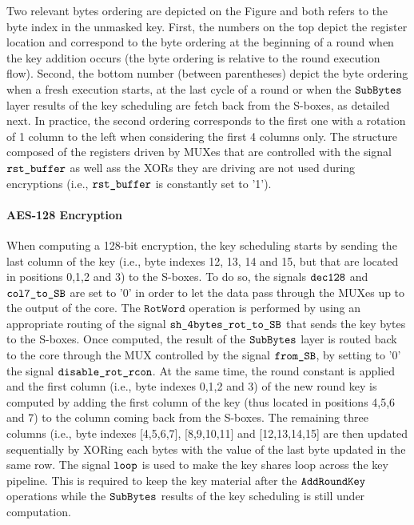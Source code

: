 \documentclass{scrartcl}
\begin{document}
Two relevant bytes ordering are depicted on the Figure and both refers to the
byte index in the unmasked key. First, the numbers on the top depict the
register location and correspond to the byte ordering at the beginning of a
round when the key addition occurs (the byte ordering is relative to the round
execution flow). Second, the bottom number (between parentheses) depict the
byte ordering when a fresh execution starts, at the last cycle of a round or
when the $\texttt{SubBytes}$ layer results of the key scheduling are fetch back from the
S-boxes, as detailed next. In practice, the second ordering corresponds to the
first one with a rotation of 1 column to the left when considering the first 4
columns only. The structure composed of the registers driven by MUXes that are
controlled with the signal $\texttt{rst\_buffer}$ as well ass the XORs they are
driving are not used during encryptions (i.e., $\texttt{rst\_buffer}$ is constantly set to
'1'). 

\paragraph{AES-128 Encryption} When computing a 128-bit encryption, the key scheduling starts by sending the
last column of the key (i.e., byte indexes 12, 13, 14 and 15, but that are
located in positions 0,1,2 and 3) to the S-boxes.  To do so, the signals
$\texttt{dec128}$ and $\texttt{col7\_to\_SB}$ are set to '0' in order
to let the data pass through the MUXes up to the output of the core.  The
$\texttt{RotWord}$ operation is performed by using an appropriate routing of
the signal $\texttt{sh\_4bytes\_rot\_to\_SB}$ that sends the key bytes to the S-boxes.  Once
computed, the result of the $\texttt{SubBytes}$ layer is routed back to the core through the
MUX controlled by the signal $\texttt{from\_SB}$, by setting to '0' the signal $\texttt{disable\_rot\_rcon}$.  At the same time, the
round constant is applied and the first column (i.e., byte indexes 0,1,2 and 3)
of the new round key is computed by adding the first column of the key (thus located in positions 4,5,6 and 7) to the column coming back from
the S-boxes. The remaining three columns (i.e., byte indexes [4,5,6,7],
[8,9,10,11] and [12,13,14,15] are then updated sequentially by XORing each
bytes with the value of the last byte updated in the same row. 
The signal $\texttt{loop}$ is used to make the key shares loop across the key
pipeline.  This is required to keep the key material after the $\texttt{AddRoundKey}$ operations
while the $\texttt{SubBytes}$ results of the key scheduling is still under computation. 
\end{document}
